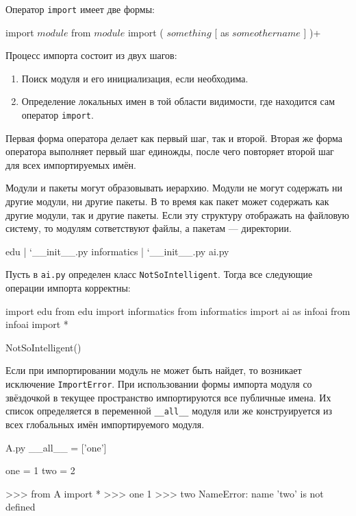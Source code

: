 Оператор \lstinline{import} имеет две формы:
\begin{pylst}{}{}
import $module$
from $module$ import ( $something$ [ as $someothername$ ] )+
\end{pylst}

Процесс импорта состоит из двух шагов:
\begin{enumerate}
  \item Поиск модуля и его инициализация, если необходима.
  \item Определение локальных имен в той области видимости, где находится сам оператор \lstinline{import}.
\end{enumerate}

Первая форма оператора делает как первый шаг, так и второй. Вторая же форма оператора выполняет первый шаг единожды, после чего повторяет второй шаг для всех импортируемых имён.

Модули и пакеты могут образовывать иерархию. Модули не могут содержать ни другие модули, ни другие пакеты. В то время как пакет может содержать как другие модули, так и другие пакеты. Если эту структуру отображать на файловую систему, то модулям сответствуют файлы, а пакетам --- директории.
\begin{plainlst}{}{}
edu
|
`__init__.py
 informatics
 |
 `__init__.py
  ai.py
\end{plainlst}

Пусть в \texttt{ai.py} определен класс \lstinline{NotSoIntelligent}. Тогда все следующие операции импорта корректны:
\begin{pylst}{}{}
import edu
from edu import informatics
from informatics import ai as infoai
from infoai import *

NotSoIntelligent()
\end{pylst}

Если при импортировании модуль не может быть найдет, то возникает исключение \lstinline{ImportError}. При использовании формы импорта модуля со звёздочкой в текущее пространство импортируются все публичные имена. Их список определяется в переменной \lstinline{__all__} модуля или же конструируется из всех глобальных имён импортируемого модуля.
\begin{pylst}{A.py}{}
__all__ = ['one']

one = 1
two = 2
\end{pylst}

\begin{pylst}{}{}
>>> from A import *
>>> one
1
>>> two
NameError: name 'two' is not defined
\end{pylst}

